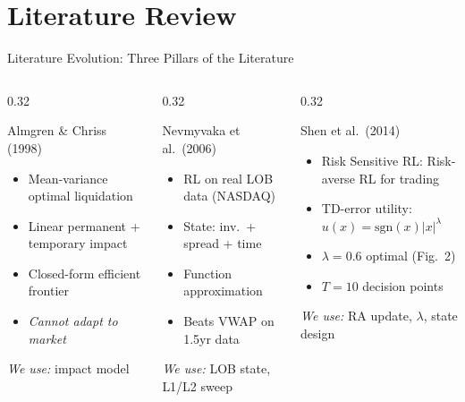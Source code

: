 \documentclass[aspectratio=169, 10pt]{beamer}
\begin{document}
\section{Literature Review}

\begin{frame}{Literature Evolution: Three Pillars of the Literature}
  \begin{columns}[T]
    \begin{column}{0.32\textwidth}
      \begin{block}{Almgren \& Chriss (1998)}
        \begin{itemize}\small
          \item Mean-variance optimal liquidation
          \item Linear permanent + temporary impact
          \item Closed-form efficient frontier
          \item \emph{Cannot adapt to market}
        \end{itemize}
        \smallskip
        \footnotesize\textit{We use:} impact model
      \end{block}
    \end{column}
    \begin{column}{0.32\textwidth}
      \begin{block}{Nevmyvaka et al.\ (2006)}
        \begin{itemize}\small
          \item RL on real LOB data (NASDAQ)
          \item State: inv.\ + spread + time
          \item Function approximation
          \item Beats VWAP on 1.5yr data
        \end{itemize}
        \smallskip
        \footnotesize\textit{We use:} LOB state, L1/L2 sweep
      \end{block}
    \end{column}
    \begin{column}{0.32\textwidth}
      \begin{block}{Shen et al.\ (2014)}
        \begin{itemize}\small
          \item Risk Sensitive RL:  Risk-averse RL for trading
          \item TD-error utility: $u(x){=}\text{sgn}(x)|x|^\lambda$
          \item $\lambda{=}0.6$ optimal (Fig.\ 2)
          \item $T{=}10$ decision points
        \end{itemize}
        \smallskip
        \footnotesize\textit{We use:} RA update, $\lambda$, state design
      \end{block}
    \end{column}
  \end{columns}


\end{frame}
\end{document}
